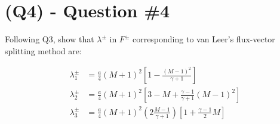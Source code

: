 \section{(Q4) - Question \#4}
\label{sec:Q4}

Following Q3, show that $\lambda^\pm$ in $F^\pm$ corresponding to van Leer's flux-vector splitting method are:

\begin{align}
    \lambda_1^\pm & = \frac{a}{4} (M + 1)^2 \left[1 - \frac{(M - 1)^2}{\gamma + 1}\right]                                   \\
    \lambda_2^\pm & = \frac{a}{4} (M + 1)^2 \left[3 - M + \frac{\gamma - 1}{\gamma + 1} (M - 1)^2\right]                    \\
    \lambda_3^\pm & = \frac{a}{4} (M + 1)^2 \left(2 \frac{M - 1}{\gamma + 1}\right) \left[1 + \frac{\gamma - 1}{2} M\right]
\end{align}
